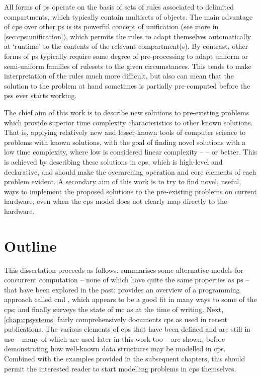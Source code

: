 All forms of \gls{ps} operate on the basis of sets of rules associated to delimited \glspl{compartment}, which typically contain multisets of objects. The main advantage of \gls{cps} over other \gls{ps} is its powerful concept of unification (see more in \vref{sec:cps:unification}), which permits the rules to adapt themselves automatically at `runtime' to the contents of the relevant \gls{compartment}(s).  By contrast, other forms of \gls{ps} typically require some degree of pre-processing to adapt uniform or semi-uniform families of \glspl{ruleset} to the given circumstances.  This tends to make interpretation of the rules much more difficult, but also can mean that the solution to the problem at hand sometimes is partially pre-computed before the \glspl{ps} ever starts working.

The chief aim of this work is to describe new solutions to pre-existing problems which provide superior time complexity characteristics to other known solutions.  That is, applying relatively new and lesser-known tools of computer science to problems with known solutions, with the goal of finding novel solutions with a low time complexity, where low is considered linear complexity --  -- or better.  
This is achieved by describing these solutions in \gls{cps}, which is high-level and declarative, and should make the overarching operation and core elements of each problem evident.
A secondary aim of this work is to try to find novel, useful, ways to implement the proposed solutions to the pre-existing problems on current hardware, even when the \gls{cps} model does not clearly map directly to the hardware.  

\section{Outline}

This dissertation proceeds as follows:  summarises some alternative models for concurrent computation -- none of which have quite the same properties as \gls{ps} -- that have been explored in the past; provides an overview of a programming approach called \gls{cml} \cite{Reppy2007,Reppy1991}, which appears to be a good fit in many ways to some of the \gls{cps}; and finally surveys the state of \gls{mc} as at the time of writing.  Next, \cref{chap:cpsystems} fairly comprehensively documents \gls{cps} as used in recent publications.  The various elements of \gls{cps} that have been defined and are still in use -- many of which are used later in this work too -- are shown, before demonstrating how well-known data structures may be modelled in \gls{cps}.  Combined with the examples provided in the subsequent chapters, this should permit the interested reader to start modelling problems in \gls{cps} themselves.

